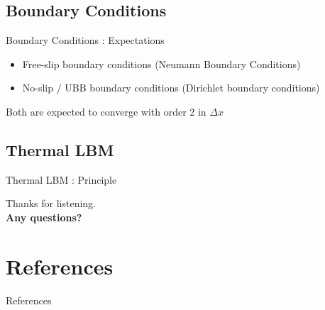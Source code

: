 \documentclass[aspectratio=43,t]{beamer}
\begin{document}
\subsection{Boundary Conditions}
\begin{frame}{Boundary Conditions : Expectations}
	\begin{block}
		
	\begin{itemize}
		\item Free-slip boundary conditions (Neumann Boundary Conditions)
		\item No-slip / UBB boundary conditions (Dirichlet boundary conditions)
	\end{itemize}
	\pause
	\centering
	Both are expected to converge with order 2 in $\Delta x$
	\end{block}
\end{frame}

\subsection{Thermal LBM}
\begin{frame}{Thermal LBM : Principle}
		\begin{center}
			
		\end{center}
\end{frame}



  { %
    \begin{frame}[c,noframenumbering]
      \begin{center}
        Thanks for listening.\\
        {\bf Any questions?}
      \end{center}
    \end{frame}

    \section*{References}
    \begin{frame}[noframenumbering]{References}
      \printbibliography
    \end{frame}
  }
\end{document}
